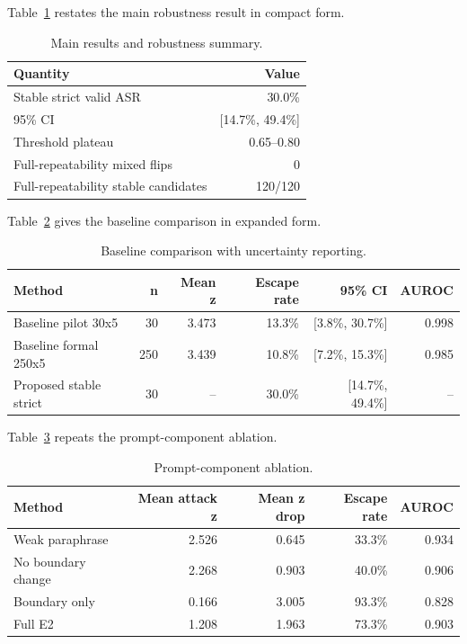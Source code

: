 Table~\ref{tab:app_main} restates the main robustness result in compact form.

\begin{table}[H]
\centering
\begin{tabular}{lr}
\toprule
Quantity & Value \\
\midrule
Stable strict valid ASR & 30.0\% \\
95\% CI & [14.7\%, 49.4\%] \\
Threshold plateau & 0.65--0.80 \\
Full-repeatability mixed flips & 0 \\
Full-repeatability stable candidates & 120/120 \\
\bottomrule
\end{tabular}
\caption{Main results and robustness summary.}
\label{tab:app_main}
\end{table}

Table~\ref{tab:app_baseline} gives the baseline comparison in expanded form.

\begin{table}[H]
\centering
\begin{tabular}{lrrrrr}
\toprule
Method & n & Mean z & Escape rate & 95\% CI & AUROC \\
\midrule
Baseline pilot 30x5 & 30 & 3.473 & 13.3\% & [3.8\%, 30.7\%] & 0.998 \\
Baseline formal 250x5 & 250 & 3.439 & 10.8\% & [7.2\%, 15.3\%] & 0.985 \\
Proposed stable strict & 30 & -- & 30.0\% & [14.7\%, 49.4\%] & -- \\
\bottomrule
\end{tabular}
\caption{Baseline comparison with uncertainty reporting.}
\label{tab:app_baseline}
\end{table}

Table~\ref{tab:app_ablation} repeats the prompt-component ablation.

\begin{table}[H]
\centering
\begin{tabular}{lrrrr}
\toprule
Method & Mean attack z & Mean z drop & Escape rate & AUROC \\
\midrule
Weak paraphrase & 2.526 & 0.645 & 33.3\% & 0.934 \\
No boundary change & 2.268 & 0.903 & 40.0\% & 0.906 \\
Boundary only & 0.166 & 3.005 & 93.3\% & 0.828 \\
Full E2 & 1.208 & 1.963 & 73.3\% & 0.903 \\
\bottomrule
\end{tabular}
\caption{Prompt-component ablation.}
\label{tab:app_ablation}
\end{table}

